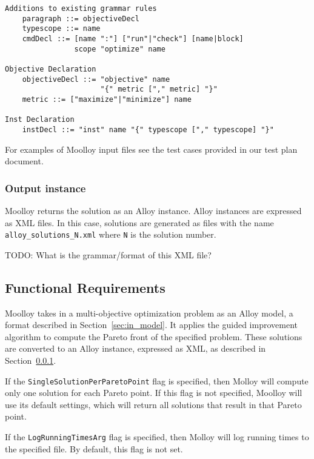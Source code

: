 \documentclass[11pt]{article}
\theoremstyle{definition}
\begin{document}
\begin{verbatim}
Additions to existing grammar rules
    paragraph ::= objectiveDecl
    typescope ::= name
    cmdDecl ::= [name ":"] ["run"|"check"] [name|block]
                scope "optimize" name

Objective Declaration
    objectiveDecl ::= "objective" name
                      "{" metric ["," metric] "}"
    metric ::= ["maximize"|"minimize"] name

Inst Declaration
    instDecl ::= "inst" name "{" typescope ["," typescope] "}"
\end{verbatim}

For examples of Moolloy input files see the test cases provided in
our test plan document.

\subsubsection{Output instance}\label{sec:out_model}

Moolloy returns the solution as an Alloy instance. Alloy instances are
expressed as XML files. In this case, solutions are generated as files
with the name \texttt{alloy\_solutions\_N.xml} where \texttt{N} is the
solution number.

TODO: What is the grammar/format of this XML file?

\subsection{Functional Requirements}\label{sec:func_req}

Moolloy takes in a multi-objective optimization problem as an Alloy
model, a format described in Section~\ref{sec:in_model}. It applies the
guided improvement algorithm to compute the Pareto front of the
specified problem. These solutions are converted to an Alloy instance,
expressed as XML, as described in Section~\ref{sec:out_model}.

If the \texttt{SingleSolutionPerParetoPoint} flag is specified, then
Molloy will compute only one solution for each Pareto point. If this
flag is not specified, Moolloy will use its default settings, which
will return all solutions that result in that Pareto point.

If the \texttt{LogRunningTimesArg} flag is specified, then Molloy will
log running times to the specified file. By default, this flag is not
set.
\end{document}
